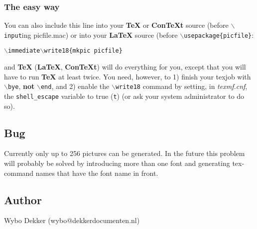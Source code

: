 \documentclass[a4paper,twocolumn]{article}
\begin{document}
\subsubsection*{The easy way\label{The_easy_way}}

You can also include this line into your \textbf{TeX} or \textbf{ConTeXt} source (before
\texttt{$\backslash$input}ing picfile.mac) or into your \textbf{LaTeX} source (before
\texttt{$\backslash$usepackage\{picfile\}}:

\texttt{$\backslash$immediate$\backslash$write18\{mkpic picfile\}}

and \textbf{TeX} (\textbf{LaTeX}, \textbf{ConTeXt}) will do everything for you, except that you
will have to run \textbf{TeX} at least twice. You need, however, to 1) finish
your texjob with \texttt{$\backslash$bye}, \textbf{not} \texttt{$\backslash$end}, and 2) enable the \texttt{$\backslash$write18}
command by setting, in \emph{texmf.cnf}, the \texttt{shell\_escape} variable to
true (\texttt{t}) (or ask your system administrator to do so).

\subsection{Bug\label{BUG}}
Currently only up to 256 pictures can be generated. In the future this
problem will probably be solved by introducing more than one font and
generating tex-command names that have the font name in front.

\subsection{Author\label{AUTHOR}}

Wybo Dekker (wybo@dekkerdocumenten.nl)
\end{document}
